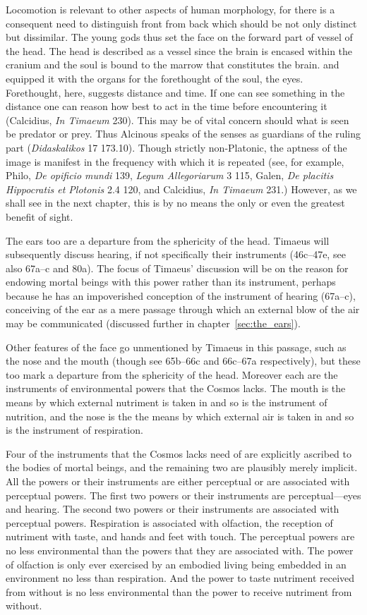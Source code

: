 Locomotion is relevant to other aspects of human morphology, for there is a consequent need to distinguish front from back which should be not only distinct but dissimilar. The young gods thus set the face on the forward part of vessel of the head. The head is described as a vessel since the brain is encased within the cranium and the soul is bound to the marrow that constitutes the brain. and equipped it with the organs for the forethought of the soul, the eyes. Forethought, here, suggests distance and time. If one can see something in the distance one can reason how best to act in the time before encountering it (Calcidius, \emph{In Timaeum} 230). This may be of vital concern should what is seen be predator or prey. Thus Alcinous speaks of the senses as guardians of the ruling part (\emph{Didaskalikos} 17 173.10). Though strictly non-Platonic, the aptness of the image is manifest in the frequency with which it is repeated (see, for example, Philo, \emph{De opificio mundi} 139, \emph{Legum Allegoriarum} 3 115, Galen, \emph{De placitis Hippocratis et Plotonis} 2.4 120, and Calcidius, \emph{In Timaeum} 231.) However, as we shall see in the next chapter, this is by no means the only or even the greatest benefit of sight. 

The ears too are a departure from the sphericity of the head. Timaeus will subsequently discuss hearing, if not specifically their instruments (46c–47e, see also 67a--c and 80a). The focus of Timaeus' discussion will be on the reason for endowing mortal beings with this power rather than its instrument, perhaps because he has an impoverished conception of the instrument of hearing (67a--c), conceiving of the ear as a mere passage through which an external blow of the air may be communicated (discussed further in chapter~\ref{sec:the_ears}). 

Other features of the face go unmentioned by Timaeus in this passage, such as the nose and the mouth (though see 65b--66c and 66c--67a respectively), but these too mark a departure from the sphericity of the head. Moreover each are the instruments of environmental powers that the Cosmos lacks. The mouth is the means by which external nutriment is taken in and so is the instrument of nutrition, and the nose is the the means by which external air is taken in and so is the instrument of respiration. 

Four of the instruments that the Cosmos lacks need of are explicitly ascribed to the bodies of mortal beings, and the remaining two are plausibly merely implicit. All the powers or their instruments are either perceptual or are associated with perceptual powers. The first two powers or their instruments are perceptual---eyes and hearing. The second two powers or their instruments are associated with perceptual powers. Respiration is associated with olfaction, the reception of nutriment with taste, and hands and feet with touch. The perceptual powers are no less environmental than the powers that they are associated with. The power of olfaction is only ever exercised by an embodied living being embedded in an environment no less than respiration. And the power to taste nutriment received from without is no less environmental than the power to receive nutriment from without. 

